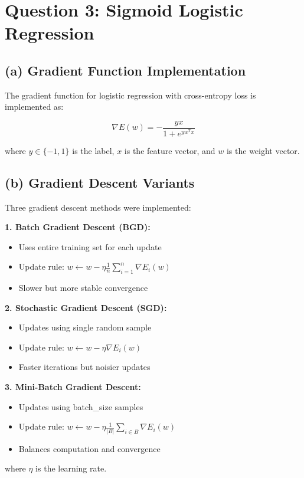 \documentclass{article}
\begin{document}
\section*{Question 3: Sigmoid Logistic Regression}

\subsection*{(a) Gradient Function Implementation}
The gradient function for logistic regression with cross-entropy loss is implemented as:

\[
\nabla E(w) = -\frac{y x}{1 + e^{y w^T x}}
\]

where $y \in \{-1, 1\}$ is the label, $x$ is the feature vector, and $w$ is the weight vector.

\subsection*{(b) Gradient Descent Variants}
Three gradient descent methods were implemented:

\textbf{1. Batch Gradient Descent (BGD):}
\begin{itemize}
    \item Uses entire training set for each update
    \item Update rule: $w \leftarrow w - \eta \frac{1}{n}\sum_{i=1}^n \nabla E_i(w)$
    \item Slower but more stable convergence
\end{itemize}

\textbf{2. Stochastic Gradient Descent (SGD):}
\begin{itemize}
    \item Updates using single random sample
    \item Update rule: $w \leftarrow w - \eta \nabla E_i(w)$
    \item Faster iterations but noisier updates
\end{itemize}

\textbf{3. Mini-Batch Gradient Descent:}
\begin{itemize}
    \item Updates using batch\_size samples
    \item Update rule: $w \leftarrow w - \eta \frac{1}{|B|}\sum_{i \in B} \nabla E_i(w)$
    \item Balances computation and convergence
\end{itemize}
where $\eta$ is the learning rate.
\end{document}
